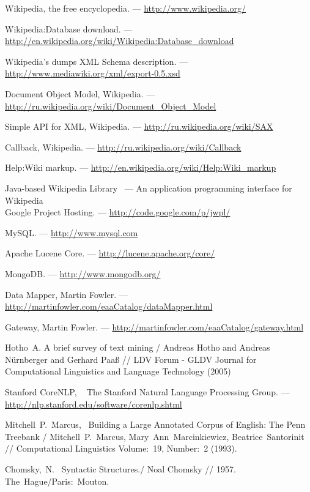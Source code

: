 Wikipedia, the free encyclopedia. --- \url{http://www.wikipedia.org/}

Wikipedia:Database download. --- \url{http://en.wikipedia.org/wiki/Wikipedia:Database_download}

Wikipedia's dumps XML Schema description. --- \url{http://www.mediawiki.org/xml/export-0.5.xsd}

Document Object Model, Wikipedia. --- \url{http://ru.wikipedia.org/wiki/Document_Object_Model}

Simple API for XML, Wikipedia. --- \url{http://ru.wikipedia.org/wiki/SAX}

Callback, Wikipedia. --- \url{http://ru.wikipedia.org/wiki/Callback}

Help:Wiki markup. --- \url{http://en.wikipedia.org/wiki/Help:Wiki_markup}

Java-based Wikipedia Library~
--- An application programming interface for Wikipedia \\
Google Project Hosting. --- \url{http://code.google.com/p/jwpl/}

MySQL. --- \url{http://www.mysql.com}

Apache Lucene Core. --- \url{http://lucene.apache.org/core/}

MongoDB. --- \url{http://www.mongodb.org/}

Data Mapper, Martin Fowler. --- \url{http://martinfowler.com/eaaCatalog/dataMapper.html}

Gateway, Martin Fowler. --- \url{http://martinfowler.com/eaaCatalog/gateway.html}

Hotho~A.
A brief survey of text mining /
Andreas Hotho and Andreas Nürnberger and Gerhard Paaß //
LDV Forum - GLDV Journal for Computational Linguistics and Language Technology (2005)

Stanford CoreNLP, ~
The Stanford Natural Language Processing Group. ---
\url{http://nlp.stanford.edu/software/corenlp.shtml}

Mitchell~P.~Marcus,~
Building a Large Annotated Corpus of English: The Penn Treebank /
Mitchell~P.~Marcus, Mary~Ann~Marcinkiewicz, Beatrice~Santorinit // 
Computational Linguistics 
Volume:~19, Number:~2 (1993).

Chomsky,~N.~
Syntactic Structures./
Noal Chomsky //
1957. The~Hague/Paris:~Mouton.

